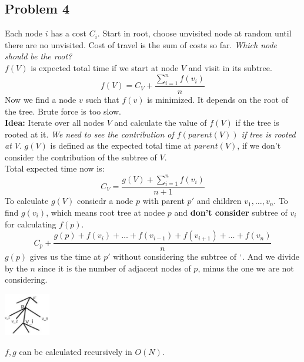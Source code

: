 \documentclass{IEEEtran}
\begin{document}
        \subsection{Problem 4}
            Each node $i$ has a cost $C_i$. Start in root, choose unvisited node at random until there are no unvisited. Cost of travel is the sum of costs so far. \textit{Which node should be the root?}\\
            $f(V)$ is expected total time if we start at node $V$ and visit in its subtree.
            $$f(V) = C_V + \frac{\sum_{i=1}^n f(v_i)}{n}$$
            Now we find a node $v$ such that $f(v)$ is minimized. It depends on the root of the tree. Brute force is too slow.\\
            \textbf{Idea:} Iterate over all nodes $V$ and calculate the value of $f(V)$ if the tree is rooted at it. \textit{We need to see the contribution of $f(parent(V))$ if tree is rooted at $V$}. $g(V)$ is defined as the expected total time at $parent(V)$, if we don't consider the contribution of the subtree of $V$.\\
            Total expected time now is:
            $$C_V = \frac{g(V) + \sum_{i=1}^n f(v_i)}{n+1}$$
            To calculate $g(V)$ consiedr a node $p$ with parent $p'$ and children $v_1,\ldots,v_n$. To find $g(v_i)$, which means root tree at nodee $p$ and \textbf{don't consider} subtree of $v_i$ for calculating $f(p)$.
            $$C_p+\frac{g(p)+f(v_i)+\ldots+f(v_{i-1})+f(v_{i+1})+\ldots+f(v_n)}{n}$$
            $g(p)$ gives us the time at  $p'$ without considering the subtree of $`$. And we divide by the $n$ since it is the number of adjacent nodes of $p$, minus the one we are not considering.\\
            \begin{center}
                \includegraphics[width = 0.15\textwidth]{randomTreeDP.png}
            \end{center}
            $f,g$ can be calculated recursively in $O(N)$.
\end{document}
